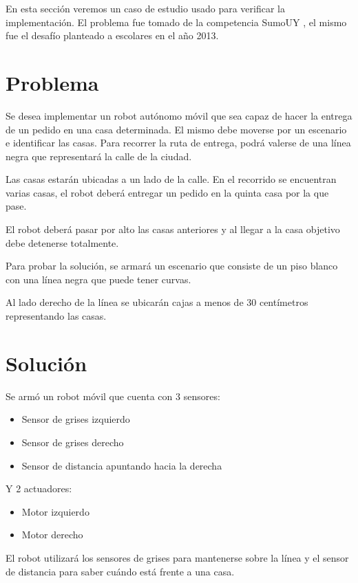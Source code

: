 
  En esta sección veremos un caso de estudio usado para verificar la
implementación.
  El problema fue tomado de la competencia SumoUY \cite{sumouy}, el mismo
fue el desafío planteado a escolares en el año 2013.

\section {Problema}

  Se desea implementar un robot autónomo móvil que sea capaz de
hacer la entrega de un pedido en una casa determinada.
  El mismo debe moverse por un escenario e identificar las casas.
  Para recorrer la ruta de entrega, podrá valerse de una línea negra
que representará la calle de la ciudad.

  Las casas estarán ubicadas a un lado de la calle. En el recorrido
se encuentran varias casas, el robot deberá entregar un pedido
en la quinta casa por la que pase.

  El robot deberá pasar por alto las casas anteriores y
al llegar a la casa objetivo debe detenerse totalmente.

  Para probar la solución, se armará un escenario que consiste de
un piso blanco con una línea negra que puede tener curvas.

  Al lado derecho de la línea se ubicarán cajas a menos de 30
centímetros representando las casas.

\section {Solución}

  Se armó un robot móvil que cuenta con 3 sensores:

\begin{itemize}
\item Sensor de grises izquierdo
\item Sensor de grises derecho
\item Sensor de distancia apuntando hacia la derecha
\end{itemize}

  Y 2 actuadores:

\begin{itemize}
\item Motor izquierdo
\item Motor derecho 
\end{itemize}

  El robot utilizará los sensores de grises para mantenerse sobre
la línea y el sensor de distancia para saber cuándo está frente
a una casa.

